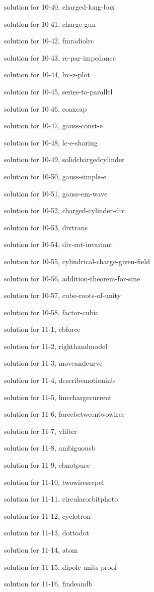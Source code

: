 \documentclass{problems}
\begin{document}
solution for 10-40, charged-long-box

solution for 10-41, charge-gun

solution for 10-42, fmradiolrc

solution for 10-43, rc-par-impedance

solution for 10-44, lrc-z-plot

solution for 10-45, series-to-parallel

solution for 10-46, coaxcap

solution for 10-47, gauss-const-e

solution for 10-48, lc-e-sharing

solution for 10-49, solidchargedcylinder

solution for 10-50, gauss-simple-e

solution for 10-51, gauss-em-wave

solution for 10-52, charged-cylinder-div

solution for 10-53, divtrans

solution for 10-54, div-rot-invariant

solution for 10-55, cylindrical-charge-given-field

solution for 10-56, addition-theorem-for-sine

solution for 10-57, cube-roots-of-unity

solution for 10-58, factor-cubic

solution for 11-1, ebforce

solution for 11-2, righthandmodel

solution for 11-3, moveandcurve

solution for 11-4, describemotioninb

solution for 11-5, linechargecurrent

solution for 11-6, forcebetweentwowires

solution for 11-7, vfilter

solution for 11-8, ambiguousb

solution for 11-9, ebnotpure

solution for 11-10, twowiresrepel

solution for 11-11, circularorbitphoto

solution for 11-12, cyclotron

solution for 11-13, dottodot

solution for 11-14, atom

solution for 11-15, dipole-units-proof

solution for 11-16, findeandb
\end{document}
